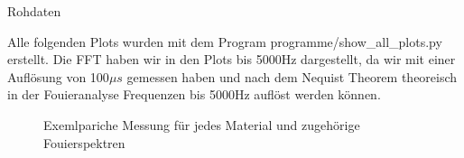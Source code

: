\documentclass[twoside]{protokoll}
\begin{document}
\begin{aufgabe}{Rohdaten}
     
    Alle folgenden Plots wurden mit dem Program programme/show\_all\_plots.py erstellt.
    Die FFT haben wir in den Plots bis 5000Hz dargestellt, da wir mit einer Auflösung von 100$\mu s$ gemessen haben und nach dem Nequist Theorem theoreisch in der Fouieranalyse Frequenzen bis 5000Hz auflöst werden können.
\begin{figure}[H]
    \caption{Exemlpariche Messung für jedes Material und zugehörige Fouierspektren}
  \centering
\end{figure}
\begin{figure}[H]
  \centering

\end{figure}
\end{aufgabe}
\end{document}

